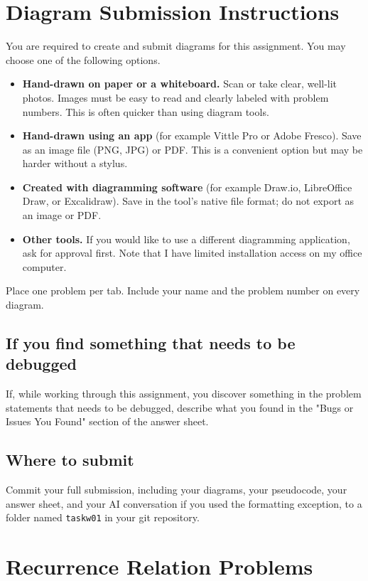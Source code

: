 \documentclass[11pt]{article}
\begin{document}
\section{Diagram Submission Instructions}
You are required to create and submit diagrams for this assignment. You may
choose one of the following options.

\begin{itemize}[leftmargin=1.4em]
  \item \textbf{Hand-drawn on paper or a whiteboard.} Scan or take clear,
        well-lit photos. Images must be easy to read and clearly labeled
        with problem numbers. This is often quicker than using diagram
        tools.
  \item \textbf{Hand-drawn using an app} (for example Vittle Pro or Adobe
        Fresco). Save as an image file (PNG, JPG) or PDF. This is a
        convenient option but may be harder without a stylus.
  \item \textbf{Created with diagramming software} (for example Draw.io,
        LibreOffice Draw, or Excalidraw). Save in the tool's native file
        format; do not export as an image or PDF.
  \item \textbf{Other tools.} If you would like to use a different
        diagramming application, ask for approval first. Note that I have
        limited installation access on my office computer.
\end{itemize}

\noindent Place one problem per tab. Include your name and the problem
number on every diagram.

\subsection*{If you find something that needs to be debugged}
If, while working through this assignment, you discover something in the
problem statements that needs to be debugged, describe what you found in
the "Bugs or Issues You Found" section of the answer sheet.

\subsection*{Where to submit}
Commit your full submission, including your diagrams, your pseudocode,
your answer sheet, and your AI conversation if you used the formatting
exception, to a folder named \texttt{taskw01} in your git repository.

\section{Recurrence Relation Problems}
\end{document}
